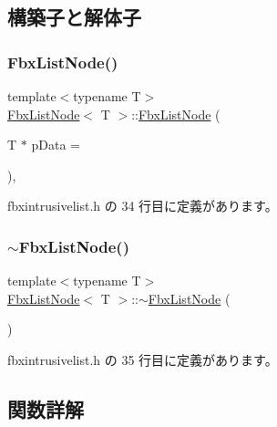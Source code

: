\subsection{構築子と解体子}
\mbox{\label{class_fbx_list_node_a785e2c232e0ed056e7a028d799fd0598}} 
\subsubsection{\texorpdfstring{Fbx\+List\+Node()}{FbxListNode()}}
{\footnotesize\ttfamily template$<$typename T$>$ \\
\hyperlink{class_fbx_list_node}{Fbx\+List\+Node}$<$ T $>$\+::\hyperlink{class_fbx_list_node}{Fbx\+List\+Node} (\begin{DoxyParamCaption}\item[{T $\ast$}]{p\+Data = {} }\end{DoxyParamCaption})\hspace{0.3cm}{\ttfamily [inline]}, {\ttfamily [explicit]}}



 fbxintrusivelist.\+h の 34 行目に定義があります。

\mbox{\label{class_fbx_list_node_aab6a6fce53b6e3928489c2a9eb91d7ff}} 
\subsubsection{\texorpdfstring{$\sim$\+Fbx\+List\+Node()}{~FbxListNode()}}
{\footnotesize\ttfamily template$<$typename T$>$ \\
\hyperlink{class_fbx_list_node}{Fbx\+List\+Node}$<$ T $>$\+::$\sim$\hyperlink{class_fbx_list_node}{Fbx\+List\+Node} (\begin{DoxyParamCaption}{ }\end{DoxyParamCaption})\hspace{0.3cm}{\ttfamily [inline]}}



 fbxintrusivelist.\+h の 35 行目に定義があります。



\subsection{関数詳解}
\mbox{\label{class_fbx_list_node_a8efc990a61791021842291e449c0c6df}} 

